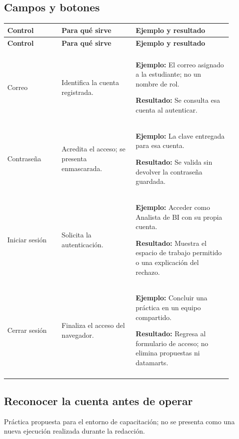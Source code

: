 \subsection{Campos y botones}
\begingroup
\fontsize{10}{12.5}\selectfont
\setlength{\tabcolsep}{5pt}
\renewcommand{\arraystretch}{1.15}
\begin{longtable}{@{}>{\RaggedRight\arraybackslash}p{0.22\linewidth}>{\RaggedRight\arraybackslash}p{0.3\linewidth}>{\RaggedRight\arraybackslash}p{0.39\linewidth}@{}}
\toprule
\textbf{Control} & \textbf{Para qué sirve} & \textbf{Ejemplo y resultado} \\
\midrule
\endfirsthead
\toprule
\textbf{Control} & \textbf{Para qué sirve} & \textbf{Ejemplo y resultado} \\
\midrule
\endhead
\midrule
\multicolumn{3}{r}{\footnotesize Continúa en la página siguiente}\\
\endfoot
\bottomrule
\endlastfoot
Correo & Identifica la cuenta registrada. & \textbf{Ejemplo:} El correo asignado a la estudiante; no un nombre de rol.\par\smallskip\textbf{Resultado:} Se consulta esa cuenta al autenticar. \\
\addlinespace[3pt]
Contraseña & Acredita el acceso; se presenta enmascarada. & \textbf{Ejemplo:} La clave entregada para esa cuenta.\par\smallskip\textbf{Resultado:} Se valida sin devolver la contraseña guardada. \\
\addlinespace[3pt]
Iniciar sesión & Solicita la autenticación. & \textbf{Ejemplo:} Acceder como Analista de BI con su propia cuenta.\par\smallskip\textbf{Resultado:} Muestra el espacio de trabajo permitido o una explicación del rechazo. \\
\addlinespace[3pt]
Cerrar sesión & Finaliza el acceso del navegador. & \textbf{Ejemplo:} Concluir una práctica en un equipo compartido.\par\smallskip\textbf{Resultado:} Regresa al formulario de acceso; no elimina propuestas ni datamarts. \\
\addlinespace[3pt]
\end{longtable}
\endgroup

\subsection{Reconocer la cuenta antes de operar}
Práctica propuesta para el entorno de capacitación; no se presenta como una nueva ejecución realizada durante la redacción.

